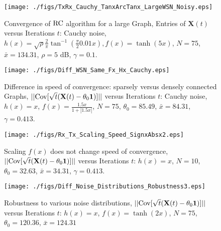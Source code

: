 \documentclass[onecolumn, draft, 12pt]{IEEEtran}
\newcommand{\rnld}{\rm RC}
\newcommand{\xbar}{\bar{x}}
\begin{document}
\begin{figure}[tb]
\begin{minipage}{1\textwidth}
\centering
\begin{center}
\texttt{[image: ./figs/TxRx\_Cauchy\_TanxArcTanx\_LargeWSN\_Noisy.eps]} \caption{Convergence of $\rnld$ algorithm for a large Graph, Entries of $\mathbf{X}(t)$ versus Iterations $t$: Cauchy noise, $h(x)= \sqrt{\rho} \frac{2}{\pi} \tan^{-1}(\frac{\pi}{2} 0.01 x), f(x)= \tanh(5 x)$, $N=75$, $\xbar=134.31$, $\rho=5$ dB, $\gamma=0.1$.}\label{fig:TxRx_Cauchy_TanxArcTanx_LargeWSN_Noisy}
\end{center}
\end{minipage}
\end{figure}

\begin{figure}[tb]
\begin{minipage}{1\textwidth}
\centering
\begin{center}
\texttt{[image: ./figs/Diff\_WSN\_Same\_Fx\_Hx\_Cauchy.eps]} \caption{Difference in speed of convergence: sparsely versus densely connected Graphs, $||{\rm Cov} [ \sqrt{t}(\mathbf{X}(t)- \theta_0 \bf{1})]||$ versus Iterations $t$: Cauchy noise, $h(x)=x$, $f(x)=\frac{1.5 x} {1+ | 1.5 x|}$, $N=75$, $\theta_0=85.49$, $\xbar=84.31$, $\gamma=0.413$.}\label{fig:Diff_WSN_Same_Fx_Hx_Cauchy}
\end{center}
\end{minipage}
\end{figure}

\begin{figure}[tb]
\begin{minipage}{1\textwidth}
\centering
\begin{center}
\texttt{[image: ./figs/Rx\_Tx\_Scaling\_Speed\_SignxAbsx2.eps]} \caption{Scaling $f(x)$ does not change speed of convergence, $||{\rm Cov} [ \sqrt{t}(\mathbf{X}(t)- \theta_0 \bf{1})]||$ versus Iterations $t$: $h(x)=x$, $N=10$, $\theta_0=32.63$, $\xbar=34.31$, $\gamma=0.413$.}\label{fig:Rx_Tx_Scaling_Speed_SignxAbsx2}
\end{center}
\end{minipage}
\end{figure}

\begin{figure}[tb]
\begin{minipage}{1\textwidth}
\centering
\begin{center}
\texttt{[image: ./figs/Diff\_Noise\_Distributions\_Robustness3.eps]} 
\caption{Robustness to various noise distributions, $||{\rm Cov} [ \sqrt{t}(\mathbf{X}(t)- \theta_0 \bf{1})]||$ versus Iterations $t$: $h(x)=x$, $f(x)= \tanh(2 x)$, $N=75$, $\theta_0=120.36$, $\xbar=124.31$}\label{fig:Diff_Noise_Distributions_Robustness3}
\end{center}
\end{minipage}
\end{figure}
\end{document}
